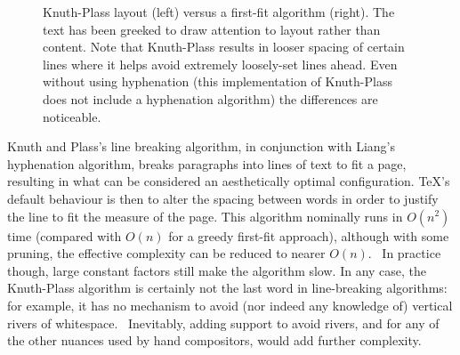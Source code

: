 \begin{figure}
\begin{center}
\end{center}
\caption[Knuth-Plass layout versus a first-fit algorithm]{Knuth-Plass layout (left) versus a first-fit algorithm (right). The text has been greeked to draw attention to layout rather than content. Note that Knuth-Plass results in looser spacing of certain lines where it helps avoid extremely loosely-set lines ahead. Even without using hyphenation (this implementation of Knuth-Plass does not include a hyphenation algorithm) the differences are noticeable. }
\label{fig:greek}
\end{figure}

Knuth and Plass's line breaking algorithm, in conjunction with Liang's hyphenation algorithm, breaks paragraphs into lines of text to fit a page, resulting in what can be considered an aesthetically optimal configuration. \TeX 's default behaviour is then to alter the spacing between words in order to justify the line to fit the measure of the page. This algorithm nominally runs in $O(n^2)$ time (compared with $O(n)$ for a greedy first-fit approach), although with some pruning, the effective complexity can be reduced to nearer $O(n)$.~\cite{Hirschberg1987,Eppstein1992,Hurst2009} In practice though, large constant factors still make the algorithm slow. In any case, the Knuth-Plass algorithm is certainly not the last word in line-breaking algorithms: for example, it has no mechanism to avoid (nor indeed any knowledge of) vertical rivers of whitespace.~\cite{Mittelbach1992} Inevitably, adding support to avoid rivers, and for any of the other nuances used by hand compositors, would add further complexity.



